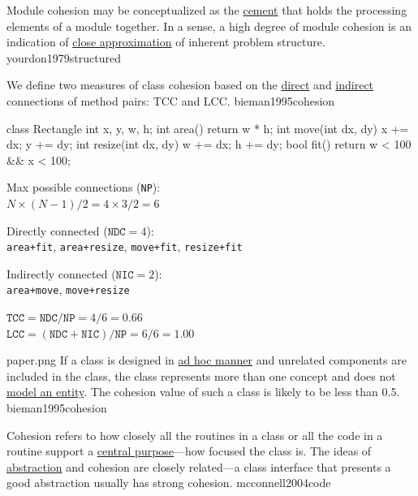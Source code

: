 \documentclass{article}
\begin{document}

  {Module cohesion may be conceptualized as the \ul{cement} that holds the processing elements of a module together. In a sense, a high degree of module cohesion is an indication of \ul{close approximation} of inherent problem structure.}
  {yourdon1979structured}

  {We define two measures of class cohesion based on the \ul{direct} and \ul{indirect} connections of method pairs: TCC and LCC.}
  {bieman1995cohesion}

\begin{multicols}{2}
{\small\begin{ffcode}
class Rectangle
  int x, y, w, h;
  int area()
    return w * h;
  int move(int dx, dy)
    x += dx; y += dy;
  int resize(int dx, dy)
    w += dx; h += dy;
  bool fit()
    return w < 100
      && x < 100;
\end{ffcode}
}
\par\columnbreak\par
Max possible connections (\texttt{NP}): \\
\( N \times (N-1) / 2 = 4 \times 3 / 2 = 6\)
\par
Directly connected (\(\texttt{NDC}=4\)): \\
\texttt{area+fit}, \texttt{area+resize}, \texttt{move+fit}, \texttt{resize+fit}
\par
Indirectly connected (\(\texttt{NIC}=2\)): \\
\texttt{area+move}, \texttt{move+resize}
\par
\(\texttt{TCC} = \texttt{NDC} / \texttt{NP} = 4/6 = 0.66 \) \\
\(\texttt{LCC} = (\texttt{NDC} + \texttt{NIC}) / \texttt{NP} = 6/6 = 1.00 \) \\
\end{multicols}
\plush{}

\qte
  {paper.png}
  {If a class is designed in \ul{ad hoc manner} and unrelated components are included in the class, the class represents more than one concept and does not \ul{model an entity}. The cohesion value of such a class is likely to be less than 0.5.}
  {bieman1995cohesion}

  {Cohesion refers to how closely all the routines in a class or all the code in a routine support a \ul{central purpose}---how focused the class is. The ideas of \ul{abstraction} and cohesion are closely related---a class interface that presents a good abstraction usually has strong cohesion.}
  {mcconnell2004code}
\end{document}
